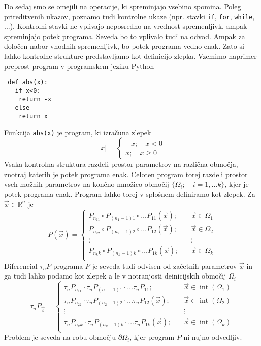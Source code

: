 \documentclass{article}
\newcommand{\RR}{\mathbb{R}}
\newcommand{\sumd}{\tau}
\DeclareMathOperator{\interior}{int}
\begin{document}
 Do sedaj smo se omejili na operacije, ki spreminjajo vsebino spomina. Poleg
 prireditvenih ukazov, poznamo tudi kontrolne ukaze (npr. stavki \texttt{if},
 \texttt{for}, \texttt{while}, ...). Kontrolni stavki ne vplivajo neposredno na
 vrednost spremenljivk, ampak spreminjajo potek programa. Seveda bo to vplivalo
 tudi na odvod. Ampak za določen nabor vhodnih spremenljivk, bo potek programa
 vedno enak. Zato si lahko kontrolne strukture predstavljamo kot definicijo
 zlepka. Vzemimo naprimer preprost program v programskem jeziku Python
 \begin{verbatim}
 def abs(x):
   if x<0:
    return -x
   else
    return x
 \end{verbatim}
 Funkcija \texttt{abs(x)} je program, ki izračuna zlepek
 \begin{equation}
   \label{eq:zlepek}
   |x| =
   \begin{cases}
     -x;\quad x<0\\
     x;\quad x\ge 0
   \end{cases}
 \end{equation}
 Vsaka kontrolna struktura razdeli prostor parametrov na različna območja,
 znotraj katerih je potek programa enak. Celoten program torej razdeli prostor
 vseh možnih parametrov na končno množico območij $\{\Omega_i;\quad i=1,\ldots
 k\}$, kjer je potek programa enak. Program lahko torej v splošnem definiramo kot
 zlepek. Za $\vec{x}\in\RR^n$ je
 \begin{equation}
   \label{eq:zlrprk_splosno}
   P(\vec{x}) =
   \begin{cases}
     P_{n_11}\circ P_{(n_1-1)1}\circ\ldots P_{11}(\vec{x});&\quad \vec{x}\in\Omega_1\\
     P_{n_22}\circ P_{(n_2-1)2}\circ\ldots P_{12}(\vec{x});&\quad \vec{x}\in\Omega_2\\
     \vdots&\quad\vdots\\
     P_{n_kk}\circ P_{(n_k-1)k}\circ\ldots P_{1k}(\vec{x});&\quad \vec{x}\in\Omega_k\\
   \end{cases}
 \end{equation}
 Diferencial $\sumd_nP$ programa $P$ je seveda tudi odvisen od začetnih parametrov
 $\vec{x}$ in ga tudi lahko podamo kot zlepek a le v notranjosti deinicijskih območij $\Omega_i$
 \begin{equation}
   \label{eq:Dzlrprk_splosno}
   \sumd_nP_{\vec{x}} =
   \begin{cases}
     \sumd_nP_{n_11}\cdot \sumd_nP_{(n_1-1)1}\cdot\ldots \sumd_nP_{11};&\quad \vec{x}\in\interior(\Omega_1)\\
     \sumd_nP_{n_22}\cdot \sumd_nP_{(n_2-1)2}\cdot\ldots \sumd_nP_{12}(\vec{x});&\quad \vec{x}\in\interior(\Omega_2)\\
     \vdots&\quad\vdots\\
     \sumd_nP_{n_kk}\cdot \sumd_nP_{(n_k-1)k}\cdot\ldots \sumd_nP_{1k}(\vec{x});&\quad \vec{x}\in\interior(\Omega_k)\\
   \end{cases}
 \end{equation}
 Problem je seveda na robu območju $\partial\Omega_i$, kjer program $P$ ni nujno odvedljiv.
\end{document}
